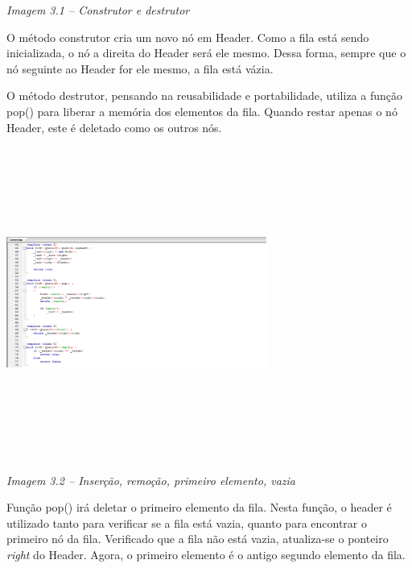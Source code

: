 \documentclass[a4paper]{article}
\newcounter{Imagem2}
\newcounter{Imagem1}
\begin{document}
{\centering
\textit{\textcolor[rgb]{0.49803922,0.49803922,0.49803922}{Imagem 3.1 –
Construtor e destrutor}}
\par}

O método construtor cria um novo nó em Header. Como a fila está sendo
inicializada, o nó a direita do Header será ele mesmo. Dessa forma,
sempre que o nó seguinte ao Header for ele mesmo, a fila está vázia.

O método destrutor, pensando na reusabilidade e portabilidade, utiliza a
função pop() para liberar a memória dos elementos da fila. Quando
restar apenas o nó Header, este é deletado como os outros nós.


\bigskip

{\centering 
\includegraphics[width=3.3602in,height=4.0193in]{T1-img12.png} \par}

{\centering
\textit{\textcolor[rgb]{0.49803922,0.49803922,0.49803922}{Imagem 3.2 –
Inserção, remoção, primeiro elemento, vazia}}
\par}


\bigskip

Função pop() irá deletar o primeiro elemento da fila. Nesta função, o
header é utilizado tanto para verificar se a fila está vazia, quanto
para encontrar o primeiro nó da fila. Verificado que a fila não está
vazia, atualiza-se o ponteiro\textit{ right} do Header. Agora, o
primeiro elemento é o antigo segundo elemento da fila.
\end{document}
